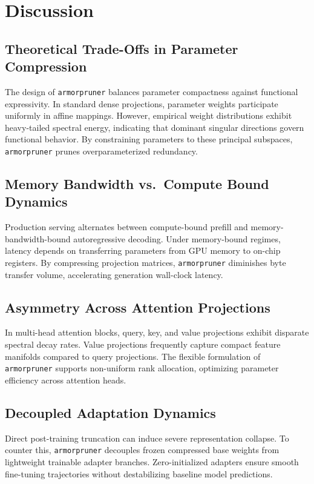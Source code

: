 \section{Discussion}

\subsection{Theoretical Trade-Offs in Parameter Compression}
The design of \texttt{armorpruner} balances parameter compactness against functional expressivity. In standard dense projections, parameter weights participate uniformly in affine mappings. However, empirical weight distributions exhibit heavy-tailed spectral energy, indicating that dominant singular directions govern functional behavior. By constraining parameters to these principal subspaces, \texttt{armorpruner} prunes overparameterized redundancy.

\subsection{Memory Bandwidth vs.\ Compute Bound Dynamics}
Production serving alternates between compute-bound prefill and memory-bandwidth-bound autoregressive decoding. Under memory-bound regimes, latency depends on transferring parameters from GPU memory to on-chip registers. By compressing projection matrices, \texttt{armorpruner} diminishes byte transfer volume, accelerating generation wall-clock latency.

\subsection{Asymmetry Across Attention Projections}
In multi-head attention blocks, query, key, and value projections exhibit disparate spectral decay rates. Value projections frequently capture compact feature manifolds compared to query projections. The flexible formulation of \texttt{armorpruner} supports non-uniform rank allocation, optimizing parameter efficiency across attention heads.

\subsection{Decoupled Adaptation Dynamics}
Direct post-training truncation can induce severe representation collapse. To counter this, \texttt{armorpruner} decouples frozen compressed base weights from lightweight trainable adapter branches. Zero-initialized adapters ensure smooth fine-tuning trajectories without destabilizing baseline model predictions.

